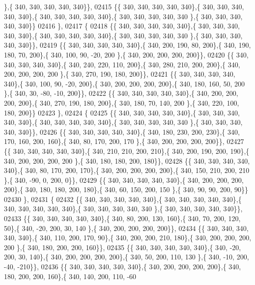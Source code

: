 \begin{DoxyCode}
      \},\{ 340, 340, 340, 340, 340\}\},
02415 \{\{ 340, 340, 340, 340, 340\},\{ 340, 340, 340, 340, 340\},\{ 340, 340, 340, 340, 340\},\{ 340, 340, 340, 340, 340
      \},\{ 340, 340, 340, 340, 340\}\}
02416 \},
02417 \{
02418 \{\{ 340, 340, 340, 340, 340\},\{ 340, 340, 340, 340, 340\},\{ 340, 340, 340, 340, 340\},\{ 340, 340, 340, 340, 340
      \},\{ 340, 340, 340, 340, 340\}\},
02419 \{\{ 340, 340, 340, 340, 340\},\{ 340, 200, 190,  80, 200\},\{ 340, 190, 180,  70, 200\},\{ 340, 100,  90, -20, 200
      \},\{ 340, 200, 200, 200, 200\}\},
02420 \{\{ 340, 340, 340, 340, 340\},\{ 340, 240, 220, 110, 200\},\{ 340, 280, 210, 200, 200\},\{ 340, 200, 200, 200, 200
      \},\{ 340, 270, 190, 180, 200\}\},
02421 \{\{ 340, 340, 340, 340, 340\},\{ 340, 100,  90, -20, 200\},\{ 340, 200, 200, 200, 200\},\{ 340, 180, 160,  50, 200
      \},\{ 340,  30, -80, -10, 200\}\},
02422 \{\{ 340, 340, 340, 340, 340\},\{ 340, 200, 200, 200, 200\},\{ 340, 270, 190, 180, 200\},\{ 340, 180,  70, 140, 200
      \},\{ 340, 220, 100, 180, 200\}\}
02423 \},
02424 \{
02425 \{\{ 340, 340, 340, 340, 340\},\{ 340, 340, 340, 340, 340\},\{ 340, 340, 340, 340, 340\},\{ 340, 340, 340, 340, 340
      \},\{ 340, 340, 340, 340, 340\}\},
02426 \{\{ 340, 340, 340, 340, 340\},\{ 340, 180, 230, 200, 230\},\{ 340, 170, 160, 200, 160\},\{ 340,  80, 170, 200, 170
      \},\{ 340, 200, 200, 200, 200\}\},
02427 \{\{ 340, 340, 340, 340, 340\},\{ 340, 210, 210, 200, 210\},\{ 340, 200, 190, 200, 190\},\{ 340, 200, 200, 200, 200
      \},\{ 340, 180, 180, 200, 180\}\},
02428 \{\{ 340, 340, 340, 340, 340\},\{ 340,  80, 170, 200, 170\},\{ 340, 200, 200, 200, 200\},\{ 340, 150, 210, 200, 210
      \},\{ 340, -90,   0, 200,   0\}\},
02429 \{\{ 340, 340, 340, 340, 340\},\{ 340, 200, 200, 200, 200\},\{ 340, 180, 180, 200, 180\},\{ 340,  60, 150, 200, 150
      \},\{ 340,  90,  90, 200,  90\}\}
02430 \},
02431 \{
02432 \{\{ 340, 340, 340, 340, 340\},\{ 340, 340, 340, 340, 340\},\{ 340, 340, 340, 340, 340\},\{ 340, 340, 340, 340, 340
      \},\{ 340, 340, 340, 340, 340\}\},
02433 \{\{ 340, 340, 340, 340, 340\},\{ 340,  80, 200, 130, 160\},\{ 340,  70, 200, 120,  50\},\{ 340, -20, 200,  30, 140
      \},\{ 340, 200, 200, 200, 200\}\},
02434 \{\{ 340, 340, 340, 340, 340\},\{ 340, 110, 200, 170,  90\},\{ 340, 200, 200, 210, 180\},\{ 340, 200, 200, 200, 200
      \},\{ 340, 180, 200, 200, 160\}\},
02435 \{\{ 340, 340, 340, 340, 340\},\{ 340, -20, 200,  30, 140\},\{ 340, 200, 200, 200, 200\},\{ 340,  50, 200, 110, 130
      \},\{ 340, -10, 200, -40, -210\}\},
02436 \{\{ 340, 340, 340, 340, 340\},\{ 340, 200, 200, 200, 200\},\{ 340, 180, 200, 200, 160\},\{ 340, 140, 200, 110, -60

\end{DoxyCode}
